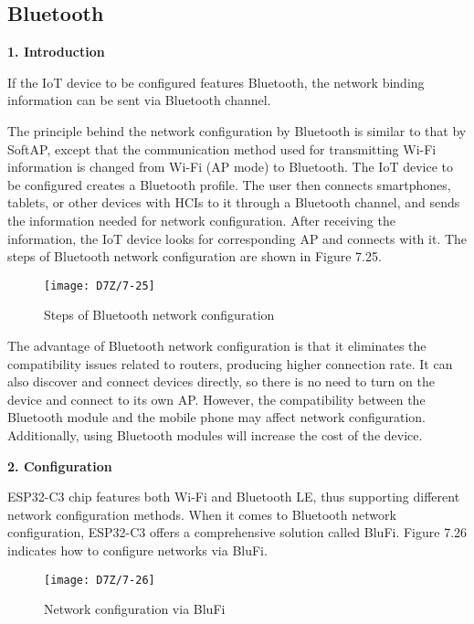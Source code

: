 \documentclass[a4paper,12pt]{book}
\begin{document}

\subsection{Bluetooth}
\textbf{1. Introduction}

If the IoT device to be configured features Bluetooth, the network binding information can be sent via Bluetooth channel.

The principle behind the network configuration by Bluetooth is similar to that by SoftAP, except that the communication method used for transmitting Wi-Fi information is changed from Wi-Fi (AP mode) to Bluetooth. The IoT device to be configured creates a Bluetooth profile. The user then connects smartphones, tablets, or other devices with HCIs to it through a Bluetooth channel, and sends the information needed for network configuration. After receiving the information, the IoT device looks for corresponding AP and connects with it. The steps of Bluetooth network configuration are shown in Figure 7.25.

\begin{figure}[!h]
    \centering
    \texttt{[image: D7Z/7-25]}
    \caption{Steps of Bluetooth network configuration}
\end{figure}

The advantage of Bluetooth network configuration is that it eliminates the compatibility issues related to routers, producing higher connection rate. It can also discover and connect devices directly, so there is no need to turn on the device and connect to its own AP. However, the compatibility between the Bluetooth module and the mobile phone may affect network configuration. Additionally, using Bluetooth modules will increase the cost of the device.

\textbf{2. Configuration}

ESP32-C3 chip features both Wi-Fi and Bluetooth LE, thus supporting different network configuration methods. When it comes to Bluetooth network configuration, ESP32-C3 offers a comprehensive solution called BluFi. Figure 7.26 indicates how to configure networks via BluFi.

\begin{figure}[!h]
    \centering
    \texttt{[image: D7Z/7-26]}
    \caption{Network configuration via BluFi}
\end{figure}
\end{document}
